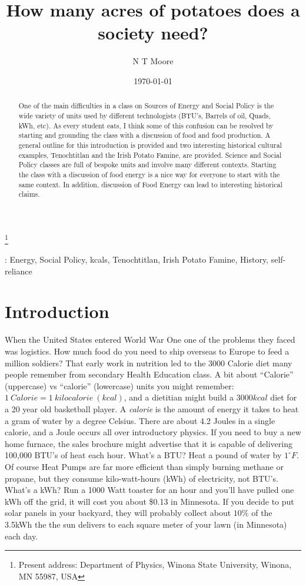 \documentclass[12pt]{iopart}
\begin{document}
\title[How many acres of potatoes does a society need?]{How many acres of potatoes does a society need?}
\author{N T Moore}
\footnote{Present address:
Department of Physics, Winona State University, Winona, MN 55987, USA}
\date{\today}
\begin{abstract}
One of the main difficulties in a class on Sources of Energy and Social Policy is the wide variety of units used by different technologists (BTU's, Barrels of oil, Quads, kWh, etc).  As every student eats, I think some of this confusion can be resolved by starting and grounding the class with a discussion of food and food production.  A general outline for this introduction is provided and two interesting historical cultural examples, Tenochtitlan and the Irish Potato Famine, are provided.  
Science and Social Policy classes are full of bespoke units and involve many different contexts.  Starting the class with a discussion of food energy is a nice way for everyone to start with the same context.  In addition, discussion of Food Energy can lead to interesting historical claims. 
\end{abstract}
: Energy, Social Policy, kcals, Tenochtitlan, Irish Potato Famine, History, self-reliance
\maketitle

\section{Introduction}
When the United States entered World War One one of the problems they faced was logistics.  How much food do you need to ship overseas to Europe to feed a million soldiers?  That early work in nutrition led to the 3000 Calorie diet many people remember from secondary Health Education class.  A bit about ``Calorie'' (uppercase) vs ``calorie'' (lowercase) units you might remember: $1~Calorie = 1~kilocalorie~(kcal)$, and a dietitian might build a $3000 kcal$ diet for a 20 year old basketball player.  A \textit{calorie} is the amount of energy it takes  to heat a gram of water by a degree Celsius.  There are about 4.2 Joules in a single calorie, and a Joule occurs all over introductory  physics.  If you need to buy a new home furnace, the sales brochure might advertise that it is capable of delivering 100,000 BTU's of heat each hour.  What's a BTU? Heat a pound of water by $1^{\circ}F$.  Of course Heat Pumps are far more efficient than simply burning methane or propane, but they consume kilo-watt-hours (kWh) of electricity, not BTU's.  What's a kWh?  Run a 1000 Watt toaster for an hour and you'll have pulled one kWh off the grid, it will cost you about \$0.13 in Minnesota.  If you decide to put solar panels in your backyard, they will probably collect about $10\%$ of the 3.5kWh the  the sun delivers to each square meter of your lawn (in Minnesota) each day.  
\end{document}
